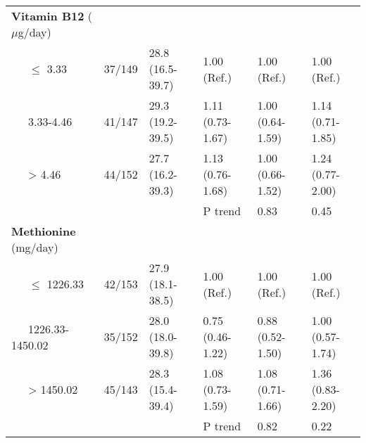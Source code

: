 \begin{landscape}
\begin{supertabular}{m{4cm}m{2.5cm}m{3cm}m{3cm}m{3cm}m{3cm}}
{\textbf{Vitamin B12
}}{($\mu$g/day)} &
~
 &
~
 &
~
 &
~
 &
~
\\

{\ \ \ }{\textrm{${\leq}$}}{
3.33} &
 37/149 &
 28.8 (16.5-39.7) &
 1.00 (Ref.) &
 1.00 (Ref.) &
 1.00 (Ref.)\\
 \ \ \ 3.33-4.46 &
 41/147 &
 29.3 (19.2-39.5) &
 1.11 (0.73-1.67) &
 1.00 (0.64-1.59) &
 1.14 (0.71-1.85)\\
 \ \ \ {\textgreater} 4.46 &
 44/152 &
 27.7 (16.2-39.3) &
 1.13 (0.76-1.68) &
 1.00 (0.66-1.52) &
 1.24 (0.77-2.00)\\
~
 &
~
 &
~
 &
 P trend &
 0.83 &
 0.45\\\hline

{\textbf{Methionine}}{
(mg/day)} &
~
 &
~
 &
~
 &
~
 &
~
\\

{\ \ \ }{\textrm{${\leq}$}}{
1226.33} &
 42/153 &
 27.9 (18.1-38.5) &
 1.00 (Ref.) &
 1.00 (Ref.) &
 1.00 (Ref.)\\
 \ \ \ 1226.33-1450.02 &
 35/152 &
 28.0 (18.0-39.8) &
 0.75 (0.46-1.22) &
 0.88 (0.52-1.50) &
 1.00 (0.57-1.74)\\
 \ \ \ {\textgreater} 1450.02 &
 45/143 &
 28.3 (15.4-39.4) &
 1.08 (0.73-1.59) &
 1.08 (0.71-1.66) &
 1.36 (0.83-2.20)\\
~
 &
~
 &
~
 &
 P trend &
 0.82 &
 0.22\\\hline
\end{supertabular}
\end{landscape}



